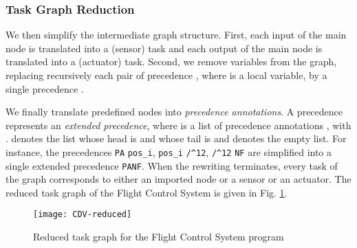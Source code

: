\subsubsection{Task Graph Reduction}
\label{sec:reduced-graph}
We then simplify the intermediate graph structure. First, each input of
the main node is translated into a (sensor) task and each output of the
main node is translated into a (actuator) task. Second, we remove
variables from the graph, replacing recursively each pair of precedence
, where  is a local variable, by a single
precedence .

We finally translate predefined nodes into \textit{precedence
  annotations}. A precedence  represents an
\textit{extended precedence}, where  is a list of precedence
annotations , with .  denotes the list whose head is  and
whose tail is  and  denotes the empty list. For instance,
the precedences \lstinline!PA! \lstinline!pos_i!,
\lstinline!pos_i! \lstinline!/^12!, \lstinline!/^12!
\lstinline!NF! are simplified into a single extended precedence
\lstinline!PA!\lstinline!NF!. When the rewriting terminates,
every task of the graph corresponds to either an imported node or a
sensor or an actuator. The reduced task graph of the Flight Control
System is given in Fig. \ref{fig:prec-graph}.


\begin{figure}[hbt]
  \centering
  \centering \texttt{[image: CDV-reduced]}
  \caption{Reduced task graph for the Flight Control System program}
  \label{fig:prec-graph}
\end{figure}



